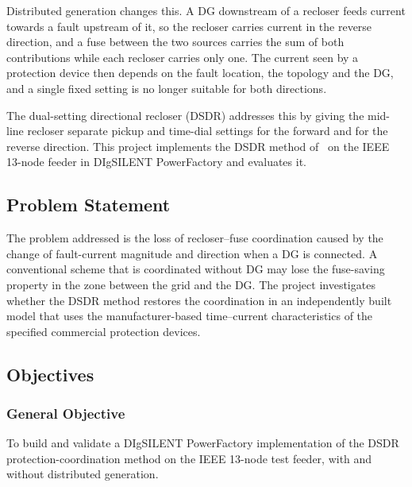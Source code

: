 \documentclass[12pt,a4paper]{article}
\newcommand{\PF}{PowerFactory}
\begin{document}
Distributed generation changes this. A DG downstream of a recloser feeds current towards a fault upstream of
it, so the recloser carries current in the reverse direction, and a fuse between the two sources carries the
sum of both contributions while each recloser carries only one. The current seen by a protection device then
depends on the fault location, the topology and the DG, and a single fixed setting is no longer suitable for
both directions.

The dual-setting directional recloser (DSDR) addresses this by giving the mid-line recloser separate pickup
and time-dial settings for the forward and for the reverse direction. This project implements the DSDR method
of~\cite{yousaf2022} on the IEEE 13-node feeder in DIgSILENT \PF{} and evaluates it.

\subsection{Problem Statement}
The problem addressed is the loss of recloser--fuse coordination caused by the change of fault-current
magnitude and direction when a DG is connected. A conventional scheme that is coordinated without DG may lose
the fuse-saving property in the zone between the grid and the DG. The project investigates whether the DSDR
method restores the coordination in an independently built model that uses the manufacturer-based
time--current characteristics of the specified commercial protection devices.

\subsection{Objectives}
\subsubsection{General Objective}
To build and validate a DIgSILENT \PF{} implementation of the DSDR protection-coordination method on the IEEE
13-node test feeder, with and without distributed generation.
\end{document}
